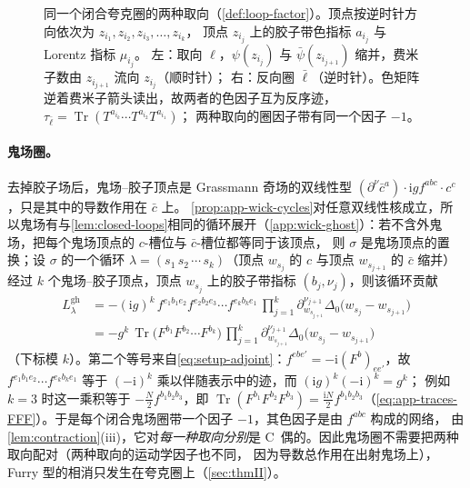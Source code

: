 \documentclass[UTF8,a4paper,11pt,fontset=fandol]{ctexart}
\theoremstyle{cplain}
\theoremstyle{cdefinition}
\theoremstyle{cremark}
\numberwithin{equation}{section}
\DeclareMathOperator{\Tr}{Tr}
\newcommand{\ii}{\mathrm{i}}                        %
\begin{document}
\begin{figure}[htbp]
\caption{同一个闭合夸克圈的两种取向（\cref{def:loop-factor}）。顶点按逆时针方向依次为 $z_{i_1},z_{i_2},z_{i_3},\dots,z_{i_k}$，
顶点 $z_{i_j}$ 上的胶子带色指标 $a_{i_j}$ 与 Lorentz 指标 $\mu_{i_j}$。
左：取向 $\ell$，$\psi(z_{i_j})$ 与 $\bar\psi(z_{i_{j+1}})$ 缩并，费米子数由 $z_{i_{j+1}}$ 流向 $z_{i_j}$（顺时针）；
右：反向圈 $\bar\ell$（逆时针）。色矩阵逆着费米子箭头读出，故两者的色因子互为反序迹，$\tau_{\bar\ell}=\Tr(T^{a_{i_k}}\cdots T^{a_{i_2}}T^{a_{i_1}})$；
两种取向的圈因子带有同一个因子 $-1$。}
\label{fig:loop-orientations}
\end{figure}

\paragraph{鬼场圈。}
去掉胶子场后，鬼场--胶子顶点是 Grassmann 奇场的双线性型 $(\partial^\nu\bar c^a)\cdot\ii gf^{abc}\cdot c^c$，只是其中的导数作用在 $\bar c$ 上。
\cref{prop:app-wick-cycles}对任意双线性核成立，所以鬼场有与\cref{lem:closed-loops}相同的循环展开（\cref{app:wick-ghost}）：若不含外鬼场，把每个鬼场顶点的 $c$-槽位与 $\bar c$-槽位都等同于该顶点，
则 $\sigma$ 是鬼场顶点的置换；设 $\sigma$ 的一个循环 $\lambda=(s_1\,s_2\,\cdots\,s_k)$（顶点 $w_{s_j}$ 的 $c$ 与顶点 $w_{s_{j+1}}$ 的 $\bar c$ 缩并）经过 $k$ 个鬼场--胶子顶点，顶点 $w_{s_j}$ 上的胶子带指标 $(b_j,\nu_j)$，则该循环贡献
\begin{equation}\label{eq:setup-ghost-loop}
\begin{aligned}
L^{\mathrm{gh}}_\lambda&=-(\ii g)^k\,f^{e_1b_1e_2}f^{e_2b_2e_3}\cdots f^{e_kb_ke_1}\,\prod_{j=1}^{k}\partial^{\nu_{j+1}}_{w_{s_{j+1}}}\Delta_0\bigl(w_{s_j}-w_{s_{j+1}}\bigr)\\
&=-g^k\,\Tr\bigl(F^{b_1}F^{b_2}\cdots F^{b_k}\bigr)\,\prod_{j=1}^{k}\partial^{\nu_{j+1}}_{w_{s_{j+1}}}\Delta_0\bigl(w_{s_j}-w_{s_{j+1}}\bigr)
\end{aligned}
\end{equation}
（下标模 $k$）。第二个等号来自\cref{eq:setup-adjoint}：$f^{ebe'}=-\ii(F^b)_{ee'}$，故 $f^{e_1b_1e_2}\cdots f^{e_kb_ke_1}$ 等于 $(-\ii)^k$ 乘以伴随表示中的迹，而 $(\ii g)^k(-\ii)^k=g^k$；
例如 $k=3$ 时这一乘积等于 $-\frac N2f^{b_1b_2b_3}$，即 $\Tr(F^{b_1}F^{b_2}F^{b_3})=\frac{\ii N}{2}f^{b_1b_2b_3}$（\cref{eq:app-traces-FFF}）。于是每个闭合鬼场圈带一个因子 $-1$，其色因子是由 $f^{abc}$ 构成的网络，
由\cref{lem:contraction}(iii)，它对\emph{每一种取向分别}是 C~偶的。因此鬼场圈不需要把两种取向配对（两种取向的运动学因子也不同，
因为导数总作用在出射鬼场上），Furry 型的相消只发生在夸克圈上（\cref{sec:thmII}）。
\end{document}
